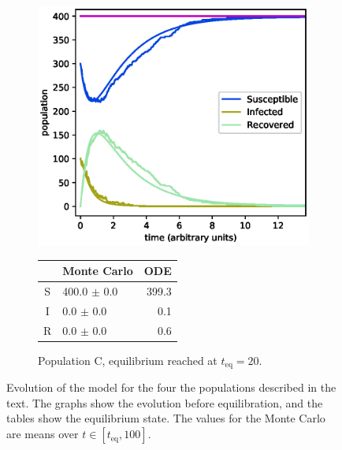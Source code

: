 \documentclass[a4paper,10pt,twocolumn]{article}
\begin{document}
\begin{figure}
\begin{subfigure}{.5\textwidth}
	\includegraphics[width=\linewidth]{a4b4c05_1.eps}
	\small
	\begin{tabular}{c l r}
   &    Monte Carlo     &  ODE  \\\hline
S &  400.0 $\pm$   0.0 &  399.3 \\
I &    0.0 $\pm$   0.0 &    0.1 \\
R &    0.0 $\pm$   0.0 &    0.6 \\\hline
	\end{tabular}
	\caption{Population C, equilibrium reached at $t_\mathrm{eq}=20$.}
	\label{fig:aD}
\end{subfigure}
	\caption{Evolution of the model for the four the populations described in the text. The graphs show the evolution before equilibration, and the tables show the equilibrium state. The values for the Monte Carlo are means over $t\in[t_\mathrm{eq},100]$.}
	\label{fig:a} 
\end{figure}
\end{document}
